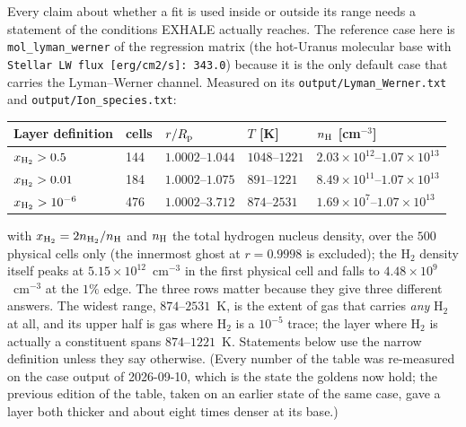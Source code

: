 \documentclass[english,a4paper]{my_memo}
\begin{document}
Every claim about whether a fit is used inside or outside its range needs a
statement of the conditions EXHALE actually reaches. The reference case here
is \texttt{mol\_lyman\_werner} of the regression matrix (the hot-Uranus
molecular base with \texttt{Stellar LW flux [erg/cm2/s]: 343.0}) because
it is the only default case that carries the Lyman--Werner channel.
Measured on its \texttt{output/Lyman\_Werner.txt} and
\texttt{output/Ion\_species.txt}:

\begin{center}
\small
\begin{tabular}{@{}lllll@{}}
\toprule
Layer definition & cells & $r/R_{\rm p}$ & $T$ [K] & $n_{\rm H}$ [cm$^{-3}$] \\
\midrule
$x_{\rm H_2} > 0.5$   & 144 & $1.0002$--$1.044$ & $1048$--$1221$ & $2.03\times10^{12}$--$1.07\times10^{13}$ \\
$x_{\rm H_2} > 0.01$  & 184 & $1.0002$--$1.075$ & $891$--$1221$  & $8.49\times10^{11}$--$1.07\times10^{13}$ \\
$x_{\rm H_2} > 10^{-6}$ & 476 & $1.0002$--$3.712$ & $874$--$2531$ & $1.69\times10^{7}$--$1.07\times10^{13}$ \\
\bottomrule
\end{tabular}
\end{center}

\noindent
with $x_{\rm H_2} = 2n_{\rm H_2}/n_{\rm H}$ and $n_{\rm H}$ the total hydrogen
nucleus density, over the $500$ physical cells only (the innermost ghost at
$r = 0.9998$ is excluded); the H$_2$ density itself peaks at
$5.15\times10^{12}$~cm$^{-3}$ in the first physical cell and falls to
$4.48\times10^{9}$~cm$^{-3}$ at the $1\%$ edge. The three rows matter because they
give three different answers. The widest range, $874$--$2531$~K, is the
extent of gas that carries \emph{any} H$_2$ at all, and its upper half is
gas where H$_2$ is a $10^{-5}$ trace; the layer where H$_2$ is actually a
constituent spans $874$--$1221$~K. Statements below use the narrow definition
unless they say otherwise. (Every number of the table was re-measured on the case
output of 2026-09-10, which is the state the goldens now hold; the previous
edition of the table, taken on an earlier state of the same case, gave a
layer both thicker and about eight times denser at its base.)
\end{document}
